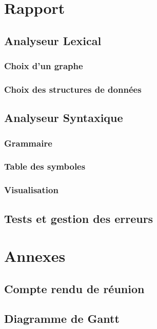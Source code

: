 \documentclass[12pt,titlepage]{report}
\begin{document}
\newpage
\chapter{Rapport}
\section{Analyseur Lexical}
\subsection{Choix d'un graphe}
\subsection{Choix des structures de données}

\section{Analyseur Syntaxique}
\subsection{Grammaire}
\subsection{Table des symboles}
\subsection{Visualisation}

\section{Tests et gestion des erreurs}

\chapter{Annexes}

\section{Compte rendu de réunion}
\section{Diagramme de Gantt}
\end{document}
